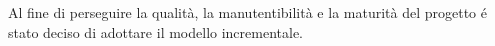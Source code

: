 Al fine di perseguire la qualità, la manutentibilità e la maturità del progetto
\'e stato deciso di adottare il {modello incrementale}.